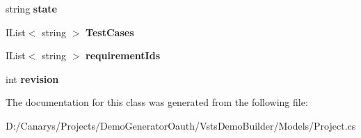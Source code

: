 \begin{DoxyCompactItemize}
string {\bfseries state}
\item 
\mbox{\label{class_vsts_demo_builder_1_1_models_1_1_test_suite_1_1_value_ae29c9fd0947aaf90104ee0221474571c}} 
I\+List$<$ string $>$ {\bfseries Test\+Cases}
\item 
\mbox{\label{class_vsts_demo_builder_1_1_models_1_1_test_suite_1_1_value_add503d78504fd8f9ddadbaed9546a50d}} 
I\+List$<$ string $>$ {\bfseries requirement\+Ids}
\item 
\mbox{\label{class_vsts_demo_builder_1_1_models_1_1_test_suite_1_1_value_a1c1f9d36673f58235767f1cbc0bd55e8}} 
int {\bfseries revision}
\end{DoxyCompactItemize}


The documentation for this class was generated from the following file\+:\begin{DoxyCompactItemize}
\item 
D\+:/\+Canarys/\+Projects/\+Demo\+Generator\+Oauth/\+Vsts\+Demo\+Builder/\+Models/Project.\+cs\end{DoxyCompactItemize}
